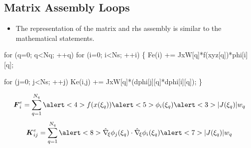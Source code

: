 \subsection*{Matrix Assembly Loops}
\begin{frame}[fragile,t]  
	\begin{block}{}
	  \begin{itemize}    
	  \item{ The \libmesh{} representation of the matrix and
	    rhs assembly is similar to the mathematical statements.
	  }
	  \end{itemize}
	\end{block}
\small
\begin{semiverbatim}
for (q=0; q<Nq; ++q) 
  for (i=0; i<Ns; ++i) \{
    \alert<2>{Fe(i)   += \alert<3>{JxW[q]}*\alert<4>{f(xyz[q])}*\alert<5>{phi[i][q]};}
    
    for (j=0; j<Ns; ++j)
      \alert<6>{Ke(i,j) += \alert<7>{JxW[q]}*(\alert<8>{dphi[j][q]*dphi[i][q]});}
  \}
\end{semiverbatim}
{
  \begin{equation}
    \nonumber
    \bv{F}^e_{i} = 
    \sum_{q=1}^{N_q}
    \alert<4>{f(x(\xi_q))}
    \alert<5>{\phi_i(\xi_q)}
    \alert<3>{|J(\xi_q)| w_q}
  \end{equation}
}
{
  \begin{equation}
  \nonumber
  \bv{K}^e_{ij} =
  \sum_{q=1}^{N_q}
  \alert<8>{
    \hat{\nabla}_{\!\xi} \phi_j(\xi_q) \cdot
    \hat{\nabla}_{\!\xi} \phi_i(\xi_q)
    }
  \alert<7>{|J(\xi_q)| w_q}
  \end{equation}
}
\end{frame}
